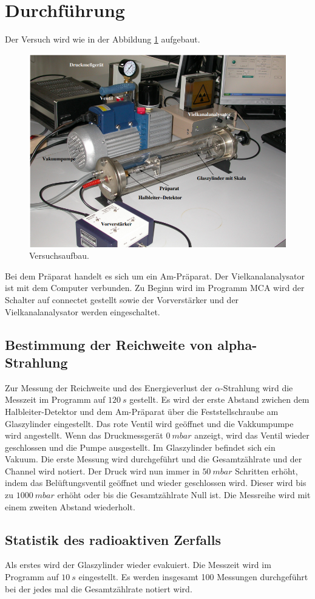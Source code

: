 \section{Durchführung}
\label{sec:Durchführung}
Der Versuch wird wie in der Abbildung \ref{fig:Aufbau} aufgebaut.
\begin{figure}
    \centering
    \includegraphics[scale=0.5]{content/Aufbau 701.png}
    \caption{Versuchsaufbau.}
    \label{fig:Aufbau}
\end{figure}
Bei dem Präparat handelt es sich um ein Am-Präparat. Der Vielkanalanalysator ist mit dem Computer verbunden.
Zu Beginn wird im Programm MCA wird der Schalter auf connectet gestellt sowie der Vorverstärker und der Vielkanalanalysator werden eingeschaltet.\\


\subsection{Bestimmung der Reichweite von alpha-Strahlung}

\noindent Zur Messung der Reichweite und des Energieverlust der $\alpha$-Strahlung wird die Messzeit im Programm auf $\qty{120}{s}$ gestellt.
Es wird der erste Abstand zwichen dem Halbleiter-Detektor und dem Am-Präparat über die Feststellschraube am Glaszylinder eingestellt.
Das rote Ventil wird geöffnet und die Vakkumpumpe wird angestellt. 
Wenn das Druckmessgerät $\qty{0}{mbar}$ anzeigt, wird das Ventil wieder geschlossen und die Pumpe ausgestellt.
Im Glaszylinder befindet sich ein Vakuum.
Die erste Messung wird durchgeführt und die Gesamtzählrate und der Channel wird notiert.
Der Druck wird nun immer in $\qty{50}{mbar}$ Schritten erhöht, indem das Belüftungsventil geöffnet und wieder geschlossen wird.
Dieser wird bis zu $\qty{1000}{mbar}$ erhöht oder bis die Gesamtzählrate Null ist.
Die Messreihe wird mit einem zweiten Abstand wiederholt.

\subsection{Statistik des radioaktiven Zerfalls}
Als erstes wird der Glaszylinder wieder evakuiert.
Die Messzeit wird im Programm auf $\qty{10}{s}$ eingestellt.
Es werden insgesamt 100 Messungen durchgeführt bei der jedes mal die Gesamtzählrate notiert wird.
